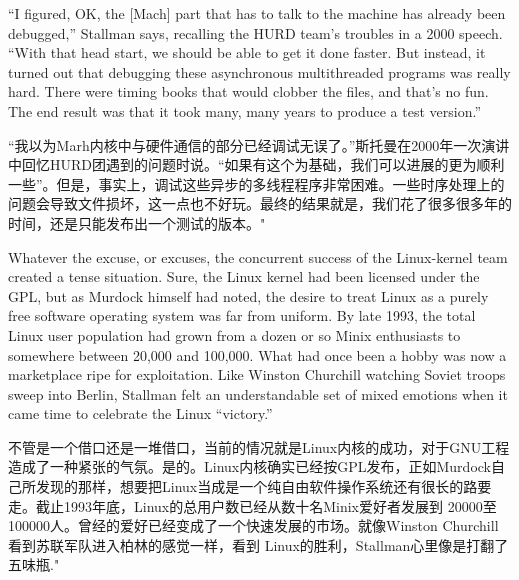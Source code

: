 \ifdefined\eng
``I figured, OK, the [Mach] part that has to talk to the machine has already been debugged,'' Stallman says, recalling the HURD team's troubles in a 2000 speech. ``With that head start, we should be able to get it done faster. But instead, it turned out that debugging these asynchronous multithreaded programs was really hard. There were timing books that would clobber the files, and that's no fun. The end result was that it took many, many years to produce a test version.''
\fi

\ifdefined\chs
``我以为Marh内核中与硬件通信的部分已经调试无误了。''斯托曼在2000年一次演讲中回忆HURD团遇到的问题时说。``如果有这个为基础，我们可以进展的更为顺利一些''。但是，事实上，调试这些异步的多线程程序非常困难。一些时序处理上的问题会导致文件损坏，这一点也不好玩。最终的结果就是，我们花了很多很多年的时间，还是只能发布出一个测试的版本。"
\fi

\ifdefined\eng
Whatever the excuse, or excuses, the concurrent success of the Linux-kernel team created a tense situation. Sure, the Linux kernel had been licensed under the GPL, but as Murdock himself had noted, the desire to treat Linux as a purely free software operating system was far from uniform. By late 1993, the total Linux user population had grown from a dozen or so Minix enthusiasts to somewhere between 20,000 and 100,000. What had once been a hobby was now a marketplace ripe for exploitation. Like Winston Churchill watching Soviet troops sweep into Berlin, Stallman felt an understandable set of mixed emotions when it came time to celebrate the Linux ``victory.''
\fi

\ifdefined\chs
不管是一个借口还是一堆借口，当前的情况就是Linux内核的成功，对于GNU工程造成了一种紧张的气氛。是的。Linux内核确实已经按GPL发布，正如Murdock自己所发现的那样，想要把Linux当成是一个纯自由软件操作系统还有很长的路要走。截止1993年底，Linux的总用户数已经从数十名Minix爱好者发展到 20000至100000人。曾经的爱好已经变成了一个快速发展的市场。就像Winston Churchill看到苏联军队进入柏林的感觉一样，看到 Linux的胜利，Stallman心里像是打翻了五味瓶." 

\fi

